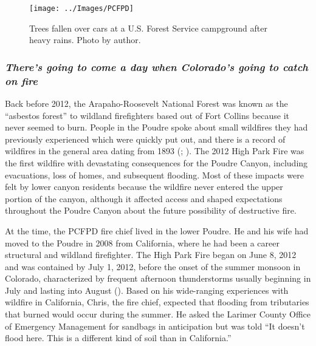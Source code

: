 \documentclass[
]{article}
\begin{document}
\begin{figure}
\texttt{[image: ../Images/PCFPD]} \caption[Trees over cars]{Trees fallen over cars at a U.S. Forest Service campground after heavy rains. Photo by author.}\label{fig:figureTitle15}
\end{figure}

\subsubsection{\texorpdfstring{\emph{There's going to come a day when Colorado's going to catch on fire}}{There's going to come a day when Colorado's going to catch on fire}}\label{theres-going-to-come-a-day-when-colorados-going-to-catch-on-fire}

Back before 2012, the Arapaho-Roosevelt National Forest was known as the ``asbestos forest'' to wildland firefighters based out of Fort Collins because it never seemed to burn. People in the Poudre spoke about small wildfires they had previously experienced which were quickly put out, and there is a record of wildfires in the general area dating from 1893 (; ). The 2012 High Park Fire was the first wildfire with devastating consequences for the Poudre Canyon, including evacuations, loss of homes, and subsequent flooding. Most of these impacts were felt by lower canyon residents because the wildfire never entered the upper portion of the canyon, although it affected access and shaped expectations throughout the Poudre Canyon about the future possibility of destructive fire.

At the time, the PCFPD fire chief lived in the lower Poudre. He and his wife had moved to the Poudre in 2008 from California, where he had been a career structural and wildland firefighter. The High Park Fire began on June 8, 2012 and was contained by July 1, 2012, before the onset of the summer monsoon in Colorado, characterized by frequent afternoon thunderstorms usually beginning in July and lasting into August (). Based on his wide-ranging experiences with wildfire in California, Chris, the fire chief, expected that flooding from tributaries that burned would occur during the summer. He asked the Larimer County Office of Emergency Management for sandbags in anticipation but was told ``It doesn't flood here. This is a different kind of soil than in California.''
\end{document}
